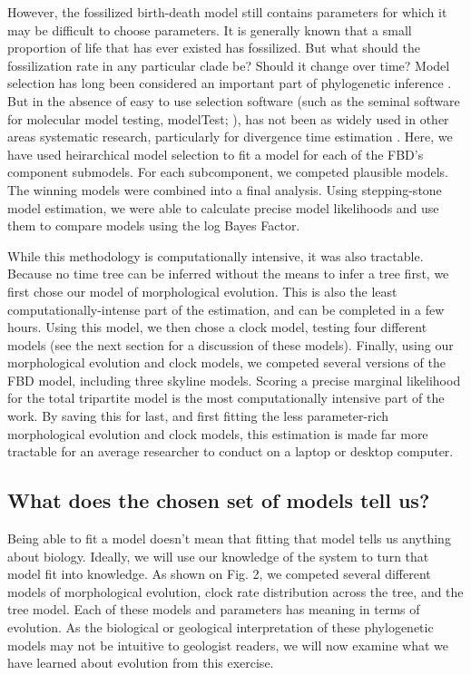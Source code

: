 \documentclass{article}
\begin{document}
However, the fossilized birth-death model still contains parameters for which it may be difficult to choose parameters.
It is generally known that a small proportion of life that has ever existed has fossilized. 
But what should the fossilization rate in any particular clade be?
Should it change over time? 
Model selection has long been considered an important part of phylogenetic inference \citep{Zwickl2004, allman08b, Baele2013a}.
But in the absence of easy to use selection software (such as the seminal software for molecular model testing, modelTest; \cite{posada1998}), has not been as widely used in other areas systematic research, particularly for divergence time estimation \citep{Duchene2015}.
Here, we have used heirarchical model selection to fit a model for each of the FBD's component submodels.
For each subcomponent, we competed plausible models.
The winning models were combined into a final analysis.
Using stepping-stone model estimation, we were able to calculate precise model likelihoods and use them to compare models using the log Bayes Factor.

While this methodology is computationally intensive, it was also tractable. 
Because no time tree can be inferred without the means to infer a tree first, we first chose our model of morphological evolution.
This is also the least computationally-intense part of the estimation, and can be completed in a few hours.
Using this model, we then chose a clock model, testing four different models (see the next section for a discussion of these models).
Finally, using our morphological evolution and clock models, we competed several versions of the FBD model, including three skyline models.
Scoring a precise marginal likelihood for the total tripartite model is the most computationally intensive part of the work. 
By saving this for last, and first fitting the less parameter-rich morphological evolution and clock models, this estimation is made far more tractable for an average researcher to conduct on a laptop or desktop computer. 

\subsection{What does the chosen set of models tell us?}

Being able to fit a model doesn't mean that fitting that model tells us anything about biology. 
Ideally, we will use our knowledge of the system to turn that model fit into knowledge. 
As shown on Fig. 2, we competed several different models of morphological evolution, clock rate distribution across the tree, and the tree model. 
Each of these models and parameters has meaning in terms of evolution. 
As the biological or geological interpretation of these phylogenetic models may not be intuitive to geologist readers, we will now examine what we have learned about evolution from this exercise.
\end{document}
